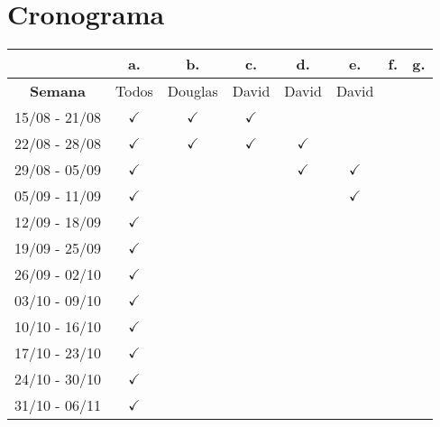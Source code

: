 \documentclass[a4paper,10pt]{article}
\begin{document}
\section{Cronograma}

\begin{tabular}{|c|c|c|c|c|c|c|c|}
\hline
              & {\bf a.}     & {\bf b.}     & {\bf c.}     & {\bf d.}     & {\bf e.}     & {\bf f.}     & {\bf g.}     \\ \hline 
{\bf Semana}  & Todos        & Douglas      & David        & David        & David        &              &              \\ \hline \hline
15/08 - 21/08 & $\checkmark$ & $\checkmark$ & $\checkmark$ &              &              &              &              \\ \hline
22/08 - 28/08 & $\checkmark$ & $\checkmark$ & $\checkmark$ & $\checkmark$ &              &              &              \\ \hline
29/08 - 05/09 & $\checkmark$ &              &              & $\checkmark$ & $\checkmark$ &              &              \\ \hline
05/09 - 11/09 & $\checkmark$ &              &              &              & $\checkmark$ &              &              \\ \hline
12/09 - 18/09 & $\checkmark$ &              &              &              &              &              &              \\ \hline
19/09 - 25/09 & $\checkmark$ &              &              &              &              &              &              \\ \hline
26/09 - 02/10 & $\checkmark$ &              &              &              &              &              &              \\ \hline
03/10 - 09/10 & $\checkmark$ &              &              &              &              &              &              \\ \hline
10/10 - 16/10 & $\checkmark$ &              &              &              &              &              &              \\ \hline
17/10 - 23/10 & $\checkmark$ &              &              &              &              &              &              \\ \hline
24/10 - 30/10 & $\checkmark$ &              &              &              &              &              &              \\ \hline
31/10 - 06/11 & $\checkmark$ &              &              &              &              &              &              \\ \hline

\end{tabular}
\end{document}
